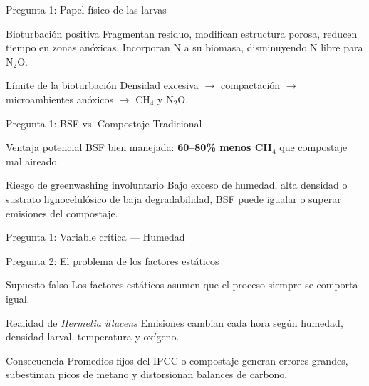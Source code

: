 \documentclass[aspectratio=169, 11pt]{beamer}
\newcommand{\BSF}{\textit{Hermetia illucens}}
\begin{document}
\begin{frame}{Pregunta 1: Papel físico de las larvas}
\begin{block}{Bioturbación positiva}
\footnotesize
Fragmentan residuo, modifican estructura porosa, reducen tiempo en zonas anóxicas. Incorporan N a su biomasa, disminuyendo N libre para N$_2$O.
\end{block}
\begin{alertblock}{Límite de la bioturbación}
\footnotesize
Densidad excesiva $\rightarrow$ compactación $\rightarrow$ microambientes anóxicos $\rightarrow$ CH$_4$ y N$_2$O.
\end{alertblock}
\end{frame}

\begin{frame}{Pregunta 1: BSF vs. Compostaje Tradicional}
\begin{exampleblock}{Ventaja potencial}
\footnotesize
BSF bien manejada: \textbf{60--80\% menos CH$_4$} que compostaje mal aireado.
\end{exampleblock}
\begin{alertblock}{Riesgo de greenwashing involuntario}
\footnotesize
Bajo exceso de humedad, alta densidad o sustrato lignocelulósico de baja degradabilidad, BSF puede igualar o superar emisiones del compostaje.
\end{alertblock}
\end{frame}

\begin{frame}{Pregunta 1: Variable crítica --- Humedad}
\centering
{}
\end{frame}

\begin{frame}{Pregunta 2: El problema de los factores estáticos}
\begin{alertblock}{Supuesto falso}
\footnotesize
Los factores estáticos asumen que el proceso siempre se comporta igual.
\end{alertblock}
\begin{block}{Realidad de \BSF}
\footnotesize
Emisiones cambian cada hora según humedad, densidad larval, temperatura y oxígeno.
\end{block}
\begin{exampleblock}{Consecuencia}
\footnotesize
Promedios fijos del IPCC o compostaje generan errores grandes, subestiman picos de metano y distorsionan balances de carbono.
\end{exampleblock}
\end{frame}
\end{document}
